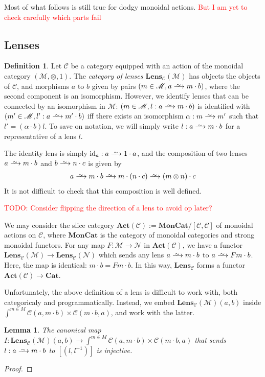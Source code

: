 \documentclass[11pt,a4paper]{amsart}
\theoremstyle{plain}
\newtheorem{lemma}[theorem]{Lemma}
\theoremstyle{definition}
\newtheorem{definition}[theorem]{Definition}
\newcommand{\id}{\mathrm{id}}
\newcommand{\C}{\mathscr{C}}
\newcommand{\M}{\mathscr{M}}
\newcommand{\N}{\mathscr{N}}
\newcommand{\Cat}{\mathbf{Cat}}
\newcommand{\MonCat}{\mathbf{MonCat}}
\newcommand{\Act}{\mathbf{Act}}
\newcommand{\Lens}{\mathbf{Lens}}
\newcommand{\todo}[1]{\textcolor{red}{\small #1}}
\newcommand{\isoto}{\xrightarrow{
   \,\smash{\raisebox{-0.65ex}{\ensuremath{\scriptstyle\sim}}}\,}}
\begin{document}
Most of what follows is still true for dodgy monoidal actions. \todo{But I am yet to check carefully which parts fail}

\subsection{Lenses}

\begin{definition}
Let $\C$ be a category equipped with an action of the monoidal category $(\M, \otimes, 1)$. The \emph{category of lenses $\Lens_\C(\M)$} has objects the objects of $\C$, and morphisms $a$ to $b$ given by pairs $(m \in \M, a \isoto m \cdot b)$, where the second component is an isomorphism. However, we identify lenses that can be connected by an isomorphism in $\M$: $(m \in \M, l : a \isoto m \cdot b)$ is identified with $(m' \in \M, l' : a \isoto m' \cdot b)$ iff there exists an isomorphism $\alpha : m \isoto m'$ such that $l' = (\alpha\cdot b)l$. To save on notation, we will simply write $l : a \isoto m \cdot b$ for a representative of a lens $l$.

The identity lens is simply $\id_a : a \isoto 1 \cdot a$, and the composition of two lenses $a \isoto m \cdot b$ and $b \isoto n \cdot c$ is given by
\begin{align*}
a \isoto m \cdot b \isoto m \cdot (n \cdot c) \isoto (m \otimes n) \cdot c
\end{align*}
It is not difficult to check that this composition is well defined.
\end{definition}
\todo{TODO: Consider flipping the direction of a lens to avoid op later?}

We may consider the slice category $\Act(\C) := \MonCat/[\C, \C]$ of monoidal actions on $\C$, where $\MonCat$ is the category of monoidal categories and strong monoidal functors. For any map $F : \M \to \N$ in $\Act(\C)$, we have a functor $\Lens_\C(\M) \to \Lens_\C(\N)$ which sends any lens $a \isoto m \cdot b$ to $a \isoto Fm \cdot b$. Here, the map is identical: $m \cdot b = Fm \cdot b$.  In this way, $\Lens_\C$ forms a functor $\Act(\C) \to \Cat$.

Unfortunately, the above definition of a lens is difficult to work with, both categoricaly and programmatically. Instead, we embed $\Lens_\C(\M)(a, b)$ inside $\int^{m \in M} \C(a, m\cdot b) \times \C(m\cdot b, a)$, and work with the latter.

\begin{lemma}
The canonical map $I : \Lens_\C(\M)(a, b) \to \int^{m \in M} \C(a, m\cdot b) \times \C(m\cdot b, a)$ that sends $l : a \isoto m \cdot b$ to $[(l, l^{-1})]$ is injective.
\end{lemma}
\begin{proof}

\end{proof}
\end{document}

